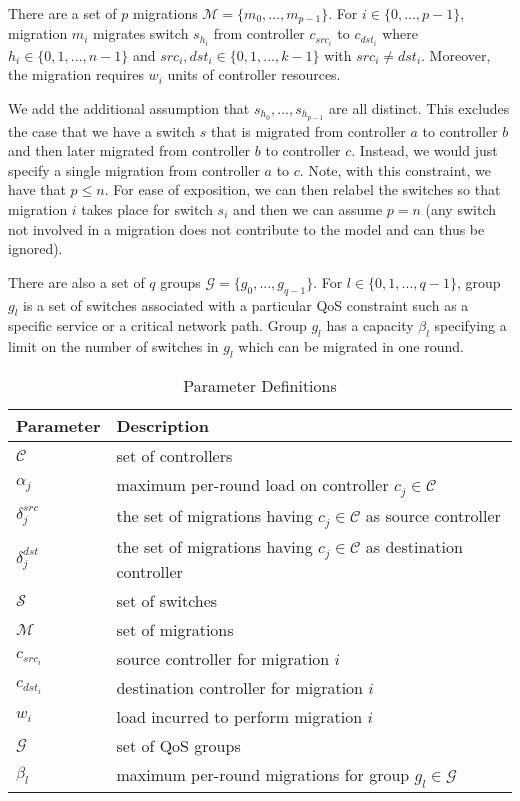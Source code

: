 \documentclass[conference]{IEEEtran}
\begin{document}
There are a set of $p$ migrations $\mathcal{M} = \{m_{0}, ..., m_{p-1}\}$. For $i \in \{0, ..., p-1\}$, migration $m_{i}$ migrates switch $s_{h_{i}}$ from controller $c_{src_{i}}$ to $c_{dst_{i}}$ where $h_{i} \in \{0, 1, ..., n - 1\}$ and $src_{i}, dst_{i} \in \{0, 1, ..., k - 1\}$ with $src_{i} \neq dst_{i}$. Moreover, the migration requires $w_{i}$ units of controller resources. 

We add the additional assumption that $s_{h_{0}}, ..., s_{h_{p-1}}$ are all distinct. This excludes the case that we have a switch $s$ that is migrated from controller $a$ to controller $b$ and then later migrated from controller $b$ to controller $c$. Instead, we would just specify a single migration from controller $a$ to $c$. Note, with this constraint, we have that $p \leq n$. For ease of exposition, we can then relabel the switches so that migration $i$ takes place for switch $s_{i}$ and then we can assume $p = n$ (any switch not involved in a migration does not contribute to the model and can thus be ignored).

There are also a set of $q$ groups $\mathcal{G} = \{g_{0}, ..., g_{q-1}\}$. For $l \in \{0, 1, ..., q - 1\}$, group $g_{l}$ is a set of switches associated with a particular QoS constraint such as a specific service or a critical network path. Group $g_{l}$ has a capacity $\beta_{l}$ specifying a limit on the number of switches in $g_{l}$ which can be migrated in one round.

\begin{table}[]
    \centering
    \begin{tabular}{||p{1.3cm}|p{6cm}||}
        \hline
        Parameter & Description \\
        \hline\hline
        $\mathcal{C}$ & set of controllers \\
        \hline
        $\alpha_{j}$ & maximum per-round load on controller $c_{j} \in \mathcal{C}$ \\
        \hline
        $\delta^{src}_{j}$ & the set of migrations having $c_{j} \in \mathcal{C}$ as source controller \\
        \hline
        $\delta^{dst}_{j}$ & the set of migrations having $c_{j} \in \mathcal{C}$ as destination controller \\
        \hline
        $\mathcal{S}$ & set of switches \\
        \hline
        $\mathcal{M}$ & set of migrations \\
        \hline
        $c_{src_{i}}$ & source controller for migration $i$ \\
        \hline
        $c_{dst_{i}}$ & destination controller for migration $i$ \\
        \hline
        $w_{i}$ & load incurred to perform migration $i$ \\
        \hline
        $\mathcal{G}$ & set of QoS groups \\
        \hline
        $\beta_{l}$ & maximum per-round migrations for group $g_{l} \in \mathcal{G}$ \\
        \hline
    \end{tabular}
    \caption{Parameter Definitions}
    \label{tbl:defs}
\end{table}
\end{document}
